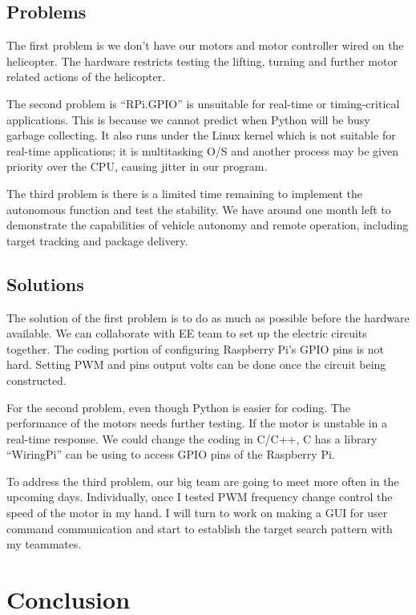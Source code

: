 \documentclass[onecolumn, draftclsnofoot,10pt, compsoc]{IEEEtran}
\begin{document}
\subsection{Problems}


The first problem is we don’t have our motors and motor controller wired on the helicopter. The hardware restricts testing the lifting, turning and further motor related actions of the helicopter.

The second problem is “RPi.GPIO” is unsuitable for real-time or timing-critical applications. This is because we cannot predict when Python will be busy garbage collecting. It also runs under the Linux kernel which is not suitable for real-time applications; it is multitasking O/S and another process may be given priority over the CPU, causing jitter in our program.

The third problem is there is a limited time remaining to implement the autonomous function and test the stability. We have around one month left to demonstrate the capabilities of vehicle autonomy and remote operation, including target tracking and package delivery.


\subsection{Solutions}


The solution of the first problem is to do as much as possible before the hardware available. We can collaborate with EE team to set up the electric circuits together. The coding portion of configuring Raspberry Pi’s GPIO pins is not hard. Setting PWM and pins output volts can be done once the circuit being constructed.

For the second problem, even though Python is easier for coding. The performance of the motors needs further testing. If the motor is unstable in a real-time response. We could change the coding in C/C++, C has a library “WiringPi” can be using to access GPIO pins of the Raspberry Pi.

To address the third problem, our big team are going to meet more often in the upcoming days. Individually, once I tested PWM frequency change control the speed of the motor in my hand. I will turn to work on making a GUI for user command communication and start to establish the target search pattern with my teammates.


\section{Conclusion}
\end{document}
